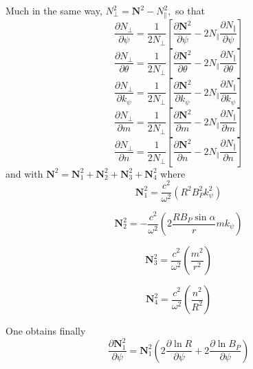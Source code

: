 \documentclass[a4paper,12pt]{article}%
\begin{document}
Much in the same way, $N_{\bot}^{2}=\mathbf{N}^{2}-N_{\Vert}^{2},$ so that%
\begin{equation}
\frac{\partial N_{\bot}}{\partial\psi}=\frac{1}{2N_{\bot}}\left[
\frac{\partial\mathbf{N}^{2}}{\partial\psi}-2N_{\Vert}\frac{\partial N_{\Vert
}}{\partial\psi}\right]
\end{equation}%
\begin{equation}
\frac{\partial N_{\bot}}{\partial\theta}=\frac{1}{2N_{\bot}}\left[
\frac{\partial\mathbf{N}^{2}}{\partial\theta}-2N_{\Vert}\frac{\partial
N_{\Vert}}{\partial\theta}\right]
\end{equation}%
\begin{equation}
\frac{\partial N_{\bot}}{\partial k_{\psi}}=\frac{1}{2N_{\bot}}\left[
\frac{\partial\mathbf{N}^{2}}{\partial k_{\psi}}-2N_{\Vert}\frac{\partial
N_{\Vert}}{\partial k_{\psi}}\right]
\end{equation}%
\begin{equation}
\frac{\partial N_{\bot}}{\partial m}=\frac{1}{2N_{\bot}}\left[  \frac
{\partial\mathbf{N}^{2}}{\partial m}-2N_{\Vert}\frac{\partial N_{\Vert}%
}{\partial m}\right]
\end{equation}%
\begin{equation}
\frac{\partial N_{\bot}}{\partial n}=\frac{1}{2N_{\bot}}\left[  \frac
{\partial\mathbf{N}^{2}}{\partial n}-2N_{\Vert}\frac{\partial N_{\Vert}%
}{\partial n}\right]
\end{equation}
and with $\mathbf{N}^{2}=\mathbf{N}_{1}^{2}+\mathbf{N}_{2}^{2}+\mathbf{N}%
_{3}^{2}+\mathbf{N}_{4}^{2}$ where%
\begin{equation}
\mathbf{N}_{1}^{2}=\frac{c^{2}}{\omega^{2}}\left(  R^{2}B_{P}^{2}k_{\psi}%
^{2}\right)
\end{equation}
%

\begin{equation}
\mathbf{N}_{2}^{2}=-\frac{c^{2}}{\omega^{2}}\left(  2\frac{RB_{P}\sin\alpha
}{r}mk_{\psi}\right)
\end{equation}
%

\begin{equation}
\mathbf{N}_{3}^{2}=\frac{c^{2}}{\omega^{2}}\left(  \frac{m^{2}}{r^{2}}\right)
\end{equation}
%

\begin{equation}
\mathbf{N}_{4}^{2}=\frac{c^{2}}{\omega^{2}}\left(  \frac{n^{2}}{R^{2}}\right)
\end{equation}


One obtains finally%
\begin{equation}
\frac{\partial\mathbf{N}_{1}^{2}}{\partial\psi}=\mathbf{N}_{1}^{2}\left(
2\frac{\partial\ln R}{\mathcal{\partial}\psi}+2\frac{\partial\ln B_{P}%
}{\mathcal{\partial}\psi}\right)
\end{equation}
%
\end{document}
